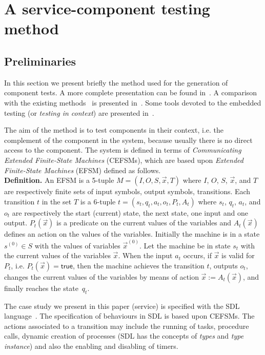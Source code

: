 
\section{A service-component testing method\label{generation_de_tests}} 

\subsection{Preliminaries}

In this section we present briefly the method used for the generation
of component tests. A more complete presentation can be found
in~\cite{chine}. A comparison with the existing
methods~\cite{bourhfir,IEEE} is presented in~\cite{cfip00}. Some tools
devoted to the embedded testing (or \emph{testing in context}) are
presented in~\cite{testcomposer,groz}.

The aim of the method is to test components in their context, i.e. the
complement of the component in the system, because usually there is
no direct access to the component. The system is defined in terms of
\emph{Communicating Extended Finite-State Machines} (CEFSMs), which
are based upon \emph{Extended Finite-State Machines} (EFSM) defined as
follows. \\

\noindent \textbf{Definition.} An EFSM is a 5-tuple
$M=(I,O,S,\vec{x},T)$ where $I$, $O$, $S$, 
$\vec{x}$, and $T$ are respectively finite sets of input symbols,
output symbols, transitions. Each transition $t$ in the set $T$ is a
6-tuple $t=(s_t,q_t,a_t,o_t,P_t,A_t)$ where $s_t$, $q_t$, $a_t$, and
$o_t$ are respectively the start (current) state, the next state, one
input and one output. $P_t(\vec{x})$ is a predicate on the current
values of the variables and $A_t(\vec{x})$ defines an action on the
values of the variables. Initially the machine is in a state
$s^{(0)}\in S$ with the values of variables $\vec{x}^{(0)}$. Let the
machine be in state $s_t$ with the current values of the variables
$\vec{x}$. When the input $a_t$ occurs, if $\vec{x}$ is valid for
$P_t$, i.e. $P_t(\vec{x})={\textsf{true}}$, then the machine achieves
the transition $t$, outputs $o_t$, changes the current values of the
variables by means of action $\vec{x}:=A_t(\vec{x})$, and finally
reaches the state~$q_t$.

The case study we present in this paper (\audio service) is specified
with the SDL language~\cite{itu}. The specification of behaviours in
SDL is based upon CEFSMs. The actions associated to a transition 
may include the running of tasks, procedure calls, dynamic creation of
processes (SDL has the concepts of \emph{types} and \emph{type
instance}) and  also the enabling and disabling of timers.

